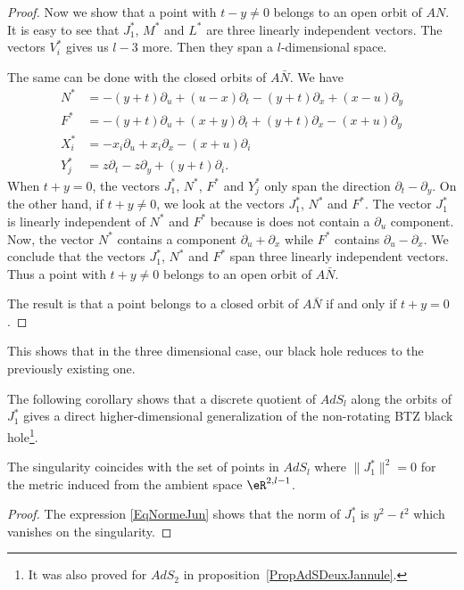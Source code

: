 \begin{proof}
	Now we show that a point with $t-y\neq 0$ belongs to an open orbit of $AN$. It is easy to see that $J_1^*$, $M^*$ and $L^*$ are three linearly independent vectors. The vectors $V_i^*$ gives us $l-3$ more. Then they span a $l$-dimensional space.

	The same can be done with the closed orbits of $A\bar{N}$. We have
	\begin{subequations}
		\begin{align}
			N^*   & =	-(y+t)\partial_u+(u-x)\partial_t-(y+t)\partial_x+(x-u)\partial_y \\
			F^*   & =	-(y+t)\partial_u+(x+y)\partial_t+(y+t)\partial_x-(x+u)\partial_y \\
			X^*_i & =	-x_i\partial_u+x_i\partial_x-(x+u)\partial_i                     \\
			Y_j^* & =	z\partial_t-z\partial_y+(y+t)\partial_i.
		\end{align}
	\end{subequations}
	When $t+y=0$, the vectors $J_1^*$, $N^*$, $F^*$ and $Y_j^*$ only span the direction $\partial_t-\partial_y$. On the other hand, if $t+y\neq 0$, we look at the vectors $J_1^*$, $N^*$ and $F^*$. The vector $J_1^*$ is linearly independent of $N^*$ and $F^*$ because is does not contain a $\partial_u$ component. Now, the vector $N^*$ contains a component $\partial_u+\partial_x$ while $F^*$ contains $\partial_u-\partial_x$. We conclude that the vectors $J_1^*$, $N^*$ and $F^*$ span three linearly independent vectors. Thus a point with $t+y\neq 0$ belongs to an open orbit of $A\bar N$.

	The result is that a point belongs to a closed orbit of $A\bar{N}$ if and only if $t+y=0$.
\end{proof}
This shows that in the three dimensional case, our black hole reduces to the previously existing one.

The following corollary shows that a discrete quotient of $AdS_l$ along the orbits of $J_1^*$ gives a direct higher-dimensional generalization of the non-rotating BTZ black hole\footnote{It was also proved for \( AdS_2\) in proposition~\ref{PropAdSDeuxJannule}.}.
\begin{corollary} \label{CorJannsingul}
	The singularity coincides with the set of points in $AdS_l$ where $\| J_1^* \|^2 = 0$ for the metric induced from the ambient space $\eR^{2,l-1}$.
\end{corollary}

\begin{proof}
	The expression \eqref{EqNormeJun} shows that the norm of $J_1^* $ is $y^2-t^2$ which vanishes on the singularity.
\end{proof}

